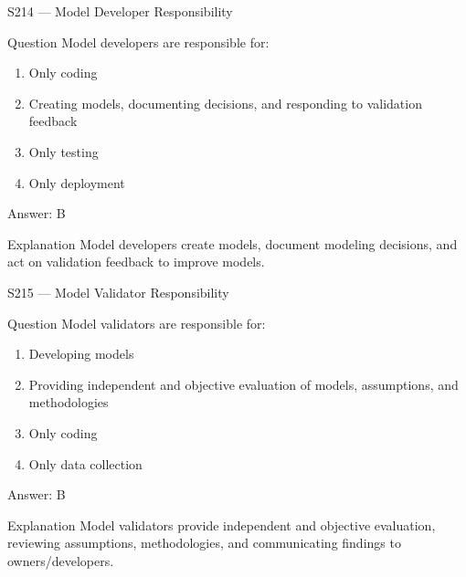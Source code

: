 \documentclass[aspectratio=169,8pt]{beamer}
\begin{document}
\begin{frame}{S214 --- Model Developer Responsibility}
	\begin{block}{Question}
		Model developers are responsible for:
		\begin{enumerate}
			\item Only coding
			\item Creating models, documenting decisions, and responding to validation feedback
			\item Only testing
			\item Only deployment
		\end{enumerate}
	\end{block}
	\begin{exampleblock}{Answer: B}\end{exampleblock}
	\begin{block}{Explanation}
		Model developers create models, document modeling decisions, and act on validation feedback to improve models.
	\end{block}
\end{frame}

\begin{frame}{S215 --- Model Validator Responsibility}
	\begin{block}{Question}
		Model validators are responsible for:
		\begin{enumerate}
			\item Developing models
			\item Providing independent and objective evaluation of models, assumptions, and methodologies
			\item Only coding
			\item Only data collection
		\end{enumerate}
	\end{block}
	\begin{exampleblock}{Answer: B}\end{exampleblock}
	\begin{block}{Explanation}
		Model validators provide independent and objective evaluation, reviewing assumptions, methodologies, and communicating findings to owners/developers.
	\end{block}
\end{frame}
\end{document}
